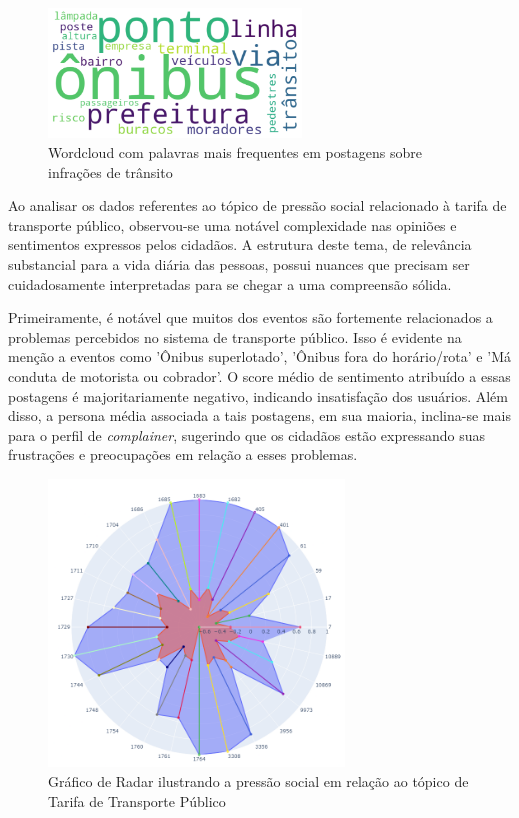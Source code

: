 \begin{figure}[htb]
	\centering
	\includegraphics[width=0.6\textwidth]{images/wordcloud_busfare.png}
	\caption{Wordcloud com palavras mais frequentes em postagens sobre infrações de trânsito}
	\label{fig:wordcloud_busfare}
\end{figure}

Ao analisar os dados referentes ao tópico de pressão social relacionado à tarifa de transporte público, observou-se uma notável complexidade nas opiniões e sentimentos expressos pelos cidadãos. A estrutura deste tema, de relevância substancial para a vida diária das pessoas, possui nuances que precisam ser cuidadosamente interpretadas para se chegar a uma compreensão sólida.

Primeiramente, é notável que muitos dos eventos são fortemente relacionados a problemas percebidos no sistema de transporte público. Isso é evidente na menção a eventos como 'Ônibus superlotado', 'Ônibus fora do horário/rota' e 'Má conduta de motorista ou cobrador'. O score médio de sentimento atribuído a essas postagens é majoritariamente negativo, indicando insatisfação dos usuários. Além disso, a persona média associada a tais postagens, em sua maioria, inclina-se mais para o perfil de \textit{complainer}, sugerindo que os cidadãos estão expressando suas frustrações e preocupações em relação a esses problemas.

\begin{figure}[htb]
	\centering
	\includegraphics[width=0.7\textwidth]{images/social_barometer_bus_fare.png}
	\caption{Gráfico de Radar ilustrando a pressão social em relação ao tópico de Tarifa de Transporte Público}
	\label{fig:social_barometer_bus_fare}
\end{figure}

